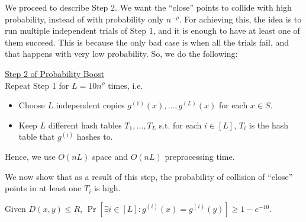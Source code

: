 \documentclass[11pt]{article}
\begin{document}
\noindent
We proceed to describe Step 2. We want the ``close'' points to collide with high probability, instead of with probability only $n^{-\rho}$. For achieving this, the idea is to run multiple independent trials of Step 1, and it is enough to have at least one of them succeed. This is because the only bad case is when all the trials fail, and that happens with very low probability. So, we do the following:
\begin{mdframed}[backgroundcolor=blue!05,topline=false,bottomline=false,leftline=false,rightline=false] \underline{\sc Step 2 of Probability Boost}\\
Repeat Step 1 for $L=10n^\rho$ times, i.e. \begin{itemize}
    \item Choose $L$ independent copies $g^{(1)}(x),\ldots,g^{(L)}(x)$ for each $x\in S$.
    \item Keep $L$ different hash tables $T_1,\ldots, T_L$ s.t. for each $i\in[L]$, $T_i$ is the hash table that $g^{(i)}$ hashes to.
\end{itemize}\end{mdframed}

Hence, we use $O(nL)$ space and $O(nL)$ preprocessing time.

We now show that as a result of this step, the probability of collision of ``close'' points in at least one $T_i$ is high. 

\begin{claim}\label{clmprob}
Given $D(x,y)\leq R$, $\Pr[\exists i\in [L]: g^{(i)}(x) = g^{(i)}(y)]\geq 1 - e^{-10}$.
\end{claim}
\end{document}
